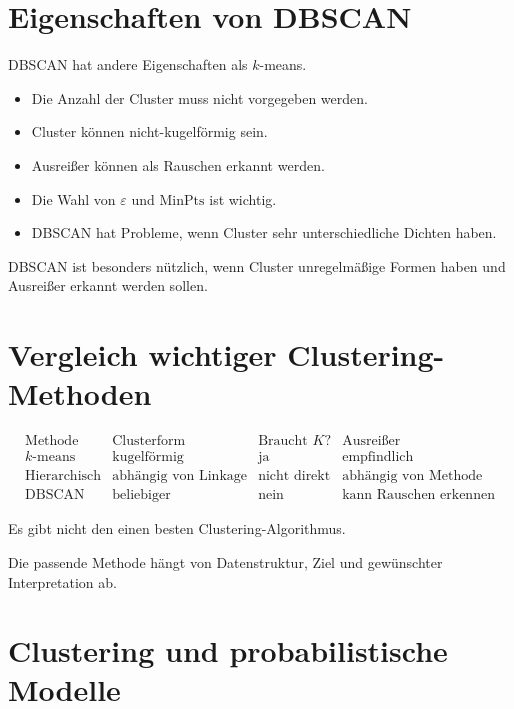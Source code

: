 \section{Eigenschaften von DBSCAN}

DBSCAN hat andere Eigenschaften als \(k\)-means.

\begin{itemize}
    \item Die Anzahl der Cluster muss nicht vorgegeben werden.
    \item Cluster können nicht-kugelförmig sein.
    \item Ausreißer können als Rauschen erkannt werden.
    \item Die Wahl von \(\varepsilon\) und \(\mathrm{MinPts}\) ist wichtig.
    \item DBSCAN hat Probleme, wenn Cluster sehr unterschiedliche Dichten haben.
\end{itemize}

\begin{conceptbox}
DBSCAN ist besonders nützlich, wenn Cluster unregelmäßige Formen haben und Ausreißer erkannt werden sollen.
\end{conceptbox}

\section{Vergleich wichtiger Clustering-Methoden}

\[
\begin{array}{c|c|c|c}
\text{Methode}
&
\text{Clusterform}
&
\text{Braucht } K?
&
\text{Ausreißer}
\\
\hline
k\text{-means}
&
\text{kugelförmig}
&
\text{ja}
&
\text{empfindlich}
\\
\hline
\text{Hierarchisch}
&
\text{abhängig von Linkage}
&
\text{nicht direkt}
&
\text{abhängig von Methode}
\\
\hline
\text{DBSCAN}
&
\text{beliebiger}
&
\text{nein}
&
\text{kann Rauschen erkennen}
\end{array}
\]

\begin{notebox}
Es gibt nicht den einen besten Clustering-Algorithmus.

Die passende Methode hängt von Datenstruktur, Ziel und gewünschter Interpretation ab.
\end{notebox}

\section{Clustering und probabilistische Modelle}

